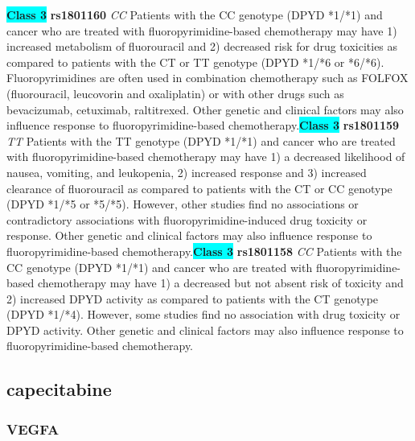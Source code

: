 \documentclass{book}
\begin{document}
\begin{center}
\textbf{\colorbox{cyan} {Class 3}} \textbf{ rs1801160 } \textit{ CC }
Patients with the CC genotype (DPYD *1/*1) and cancer who are treated with fluoropyrimidine-based chemotherapy may have 1) increased metabolism of fluorouracil and 2) decreased risk for drug toxicities as compared to patients with the CT or TT genotype (DPYD *1/*6 or *6/*6). Fluoropyrimidines are often used in combination chemotherapy such as FOLFOX (fluorouracil, leucovorin and oxaliplatin) or with other drugs such as bevacizumab, cetuximab, raltitrexed. Other genetic and clinical factors may also influence response to fluoropyrimidine-based chemotherapy.\textbf{\colorbox{cyan} {Class 3}} \textbf{ rs1801159 } \textit{ TT }
Patients with the TT genotype (DPYD *1/*1) and cancer who are treated with fluoropyrimidine-based chemotherapy may have 1) a decreased likelihood of nausea, vomiting, and leukopenia, 2) increased response and 3) increased clearance of fluorouracil as compared to patients with the CT or CC genotype (DPYD *1/*5 or *5/*5). However, other studies find no associations or contradictory associations with fluoropyrimidine-induced drug toxicity or response. Other genetic and clinical factors may also influence response to fluoropyrimidine-based chemotherapy.\textbf{\colorbox{cyan} {Class 3}} \textbf{ rs1801158 } \textit{ CC }
Patients with the CC genotype (DPYD *1/*1) and cancer who are treated with fluoropyrimidine-based chemotherapy may have 1) a decreased but not absent risk of toxicity and 2) increased DPYD activity as compared to patients with the CT genotype (DPYD *1/*4). However, some studies find no association with drug toxicity or DPYD activity. Other genetic and clinical factors may also influence response to fluoropyrimidine-based chemotherapy.


\end{center}\subsection{ capecitabine }


\subsubsection{ VEGFA }
\end{document}
